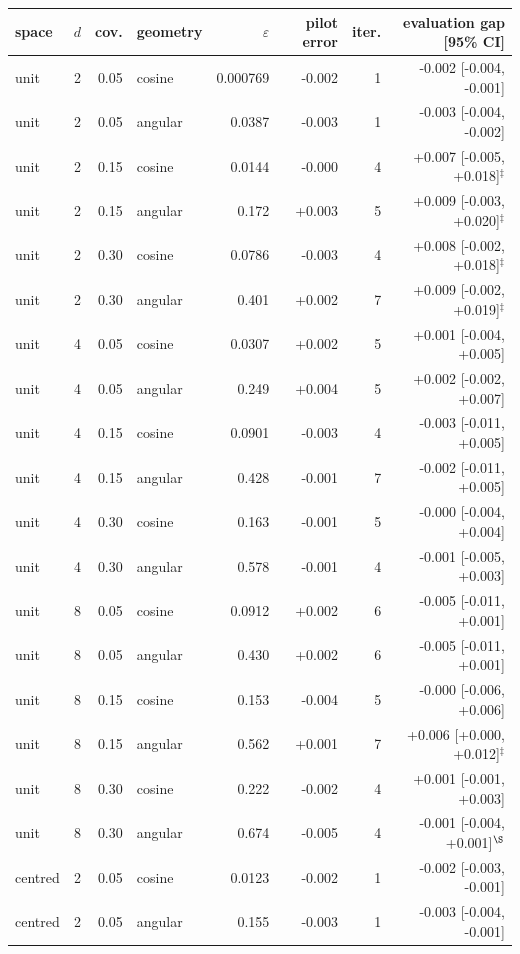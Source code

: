 \begin{tabular}{lrrlrrrr}
\toprule
space & $d$ & cov. & geometry & $\varepsilon$ & pilot error & iter. & evaluation gap [95\% CI] \\
\midrule
unit & 2 & 0.05 & cosine & 0.000769 & -0.002 & 1 & -0.002 [-0.004, -0.001] \\
unit & 2 & 0.05 & angular & 0.0387 & -0.003 & 1 & -0.003 [-0.004, -0.002] \\
unit & 2 & 0.15 & cosine & 0.0144 & -0.000 & 4 & +0.007 [-0.005, +0.018]$^{\ddagger}$ \\
unit & 2 & 0.15 & angular & 0.172 & +0.003 & 5 & +0.009 [-0.003, +0.020]$^{\ddagger}$ \\
unit & 2 & 0.30 & cosine & 0.0786 & -0.003 & 4 & +0.008 [-0.002, +0.018]$^{\ddagger}$ \\
unit & 2 & 0.30 & angular & 0.401 & +0.002 & 7 & +0.009 [-0.002, +0.019]$^{\ddagger}$ \\
unit & 4 & 0.05 & cosine & 0.0307 & +0.002 & 5 & +0.001 [-0.004, +0.005] \\
unit & 4 & 0.05 & angular & 0.249 & +0.004 & 5 & +0.002 [-0.002, +0.007] \\
unit & 4 & 0.15 & cosine & 0.0901 & -0.003 & 4 & -0.003 [-0.011, +0.005] \\
unit & 4 & 0.15 & angular & 0.428 & -0.001 & 7 & -0.002 [-0.011, +0.005] \\
unit & 4 & 0.30 & cosine & 0.163 & -0.001 & 5 & -0.000 [-0.004, +0.004] \\
unit & 4 & 0.30 & angular & 0.578 & -0.001 & 4 & -0.001 [-0.005, +0.003] \\
unit & 8 & 0.05 & cosine & 0.0912 & +0.002 & 6 & -0.005 [-0.011, +0.001] \\
unit & 8 & 0.05 & angular & 0.430 & +0.002 & 6 & -0.005 [-0.011, +0.001] \\
unit & 8 & 0.15 & cosine & 0.153 & -0.004 & 5 & -0.000 [-0.006, +0.006] \\
unit & 8 & 0.15 & angular & 0.562 & +0.001 & 7 & +0.006 [+0.000, +0.012]$^{\ddagger}$ \\
unit & 8 & 0.30 & cosine & 0.222 & -0.002 & 4 & +0.001 [-0.001, +0.003] \\
unit & 8 & 0.30 & angular & 0.674 & -0.005 & 4 & -0.001 [-0.004, +0.001]$^{\S}$ \\
centred & 2 & 0.05 & cosine & 0.0123 & -0.002 & 1 & -0.002 [-0.003, -0.001] \\
centred & 2 & 0.05 & angular & 0.155 & -0.003 & 1 & -0.003 [-0.004, -0.001] \\

\end{tabular}
